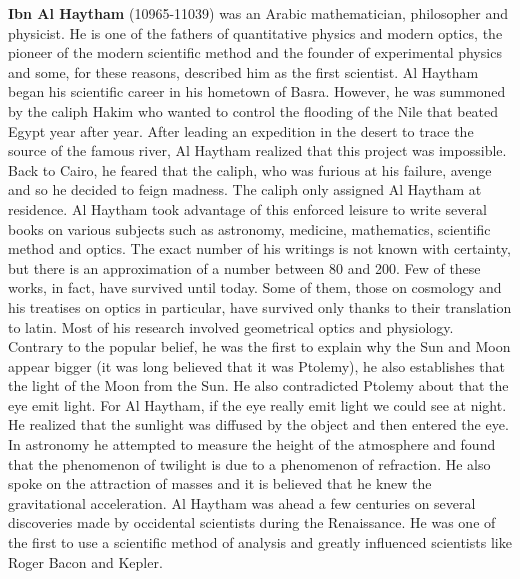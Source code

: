 \textbf{Ibn Al Haytham} (10965-11039) was an Arabic mathematician, philosopher and physicist. He is one of the fathers of quantitative physics and modern optics, the pioneer of the modern scientific method and the founder of experimental physics and some, for these reasons, described him as the first scientist. Al Haytham began his scientific career in his hometown of Basra. However, he was summoned by the caliph Hakim who wanted to control the flooding of the Nile that beated Egypt year after year. After leading an expedition in the desert to trace the source of the famous river, Al Haytham realized that this project was impossible. Back to Cairo, he feared that the caliph, who was furious at his failure, avenge and so he decided to feign madness. The caliph only assigned Al Haytham at residence. Al Haytham took advantage of this enforced leisure to write several books on various subjects such as astronomy, medicine, mathematics, scientific method and optics. The exact number of his writings is not known with certainty, but there is an approximation of a number between 80 and 200. Few of these works, in fact, have survived until today. Some of them, those on cosmology and his treatises on optics in particular, have survived only thanks to their translation to latin. Most of his research involved geometrical optics and physiology. Contrary to the popular belief, he was the first to explain why the Sun and Moon appear bigger (it was long believed that it was Ptolemy), he also establishes that the light of the Moon from the Sun. He also contradicted Ptolemy about that the eye emit light. For Al Haytham, if the eye really emit light we could see at night. He realized that the sunlight was diffused by the object and then entered the eye. In astronomy he attempted to measure the height of the atmosphere and found that the phenomenon of twilight is due to a phenomenon of refraction. He also spoke on the attraction of masses and it is believed that he knew the gravitational acceleration. Al Haytham was ahead a few centuries on several discoveries made by occidental scientists during the Renaissance. He was one of the first to use a scientific method of analysis and greatly influenced scientists like Roger Bacon and Kepler.

{}
\label{sec:J}

